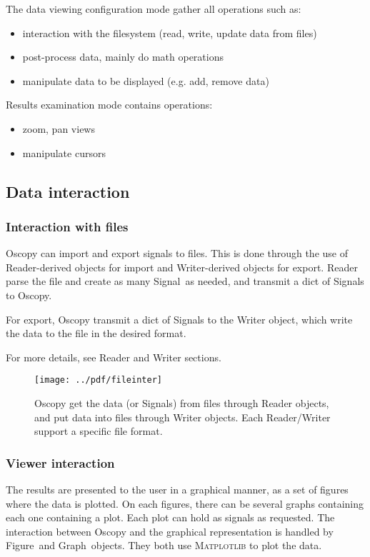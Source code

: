 \documentclass[a4paper,11pt]{article}
\newcommand{\cls}[1]{\textsf{#1}}
\newcommand{\sig}{\cls{Signal}}
\newcommand{\module}[1]{\textsc{#1}}
\newcommand{\graph}{\cls{Graph}}
\newcommand{\fig}{\cls{Figure}}
\begin{document}
The data viewing configuration mode gather all operations such as:
\begin{itemize}
\item interaction with the filesystem (read, write, update data from files)
\item post-process data, mainly do math operations
\item manipulate data to be displayed (e.g. add, remove data)
\end{itemize}
Results examination mode contains operations:
\begin{itemize}
\item zoom, pan views
\item manipulate cursors
\end{itemize}

\subsection{Data interaction}
\label{sec:data}

\subsubsection{Interaction with files}
\label{sec:fileinter}
Oscopy can import and export signals to files.
This is done through the use of Reader-derived objects for import and Writer-derived objects for export.
Reader parse the file and create as many \sig\ as needed, and transmit a dict of \sig s to Oscopy.

For export, Oscopy transmit a dict of \sig s to the Writer object, which write the data to the file in the desired format.

For more details, see Reader and Writer sections.

\begin{figure}[htbp]
  \centering
  \texttt{[image: ../pdf/fileinter]}
  \caption{Oscopy get the data (or \sig s) from files through Reader objects, and put data into files through Writer objects. Each Reader/Writer support a specific file format.}
  \label{fig:fileinter}
\end{figure}

\subsubsection{Viewer interaction}
\label{sec:viewinter}
The results are presented to the user in a graphical manner, as a set of figures where the data is plotted.
On each figures, there can be several graphs containing each one containing a plot.
Each plot can hold as signals as requested.
The interaction between Oscopy and the graphical representation is handled by \fig\ and \graph\ objects.
They both use \module{Matplotlib} to plot the data.
\end{document}
